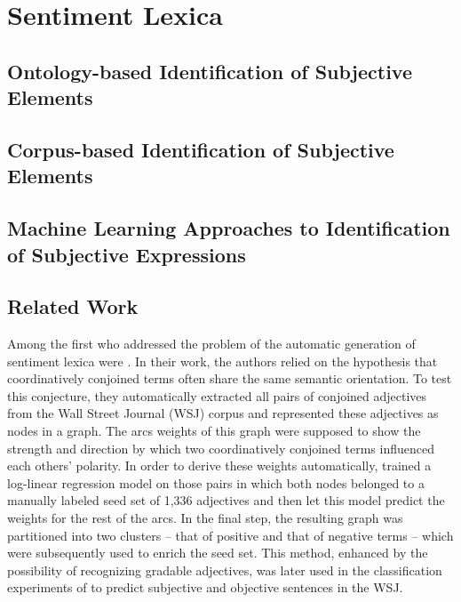 

\section{Sentiment Lexica}
\subsection{Ontology-based Identification of Subjective Elements}
\subsection{Corpus-based Identification of Subjective Elements}
\subsection{Machine Learning Approaches to Identification of Subjective Expressions}

\subsection{Related Work}

Among the first who addressed the problem of the automatic generation
of sentiment lexica were \citet{Hatzivassi:97}.  In their work, the
authors relied on the hypothesis that coordinatively conjoined terms
often share the same semantic orientation.  To test this conjecture,
they automatically extracted all pairs of conjoined adjectives from
the Wall Street Journal (WSJ) corpus and represented these adjectives
as nodes in a graph.  The arcs weights of this graph were supposed to
show the strength and direction by which two coordinatively conjoined
terms influenced each others' polarity.  In order to derive these
weights automatically, \citeauthor{Hatzivassi:97} trained a log-linear
regression model on those pairs in which both nodes belonged to a
manually labeled seed set of 1,336 adjectives and then let this model
predict the weights for the rest of the arcs.  In the final step, the
resulting graph was partitioned into two clusters -- that of positive
and that of negative terms -- which were subsequently used to enrich
the seed set.  This method, enhanced by the possibility of recognizing
gradable adjectives, was later used in the classification experiments
of \citet{Hatzivassi:00} to predict subjective and objective sentences
in the WSJ.

